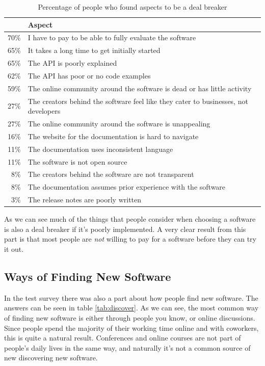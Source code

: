 \documentclass{cslthse-msc}
\begin{document}
    \begin{table}[H]
        \centering
        \caption{Percentage of people who found aspects to be a deal breaker}
        \label{tab:dealbreaker}
        \begin{tabularx}{\columnwidth}{r X}
            & \textbf{Aspect}	\\ \hline
            70\%	&	I have to pay to be able to fully evaluate the software	\\
            65\%	&	It takes a long time to get initially started	\\
            65\%	&	The API is poorly explained	\\
            62\%	&	The API has poor or no code examples	\\
            59\%	&	The online community around the software is dead or has little activity	\\
            27\%	&	The creators behind the software feel like they cater to businesses, not developers	\\
            27\%	&	The online community around the software is unappealing	\\
            16\%	&	The website for the documentation is hard to navigate	\\
            11\%	&	The documentation uses inconsistent language	\\
            11\%	&	The software is not open source	\\
            8\%	&	The creators behind the software are not transparent	\\
            8\%	&	The documentation assumes prior experience with the software	\\
            3\%	&	The release notes are poorly written	\\ \hline
        \end{tabularx}
    \end{table}

    As we can see much of the things that people consider when choosing a software is also a deal breaker if it's poorly implemented. A very clear result from this part is that most people are \textit{not} willing to pay for a software before they can try it out.

    \subsection{Ways of Finding New Software}
    In the test survey there was also a part about how people find new software. The answers can be seen in table \ref{tab:discover}. As we can see, the most common way of finding new software is either through people you know, or online discussions. Since people spend the majority of their working time online and with coworkers, this is quite a natural result. Conferences and online courses are not part of people's daily lives in the same way, and naturally it's not a common source of new discovering new software.
\end{document}
